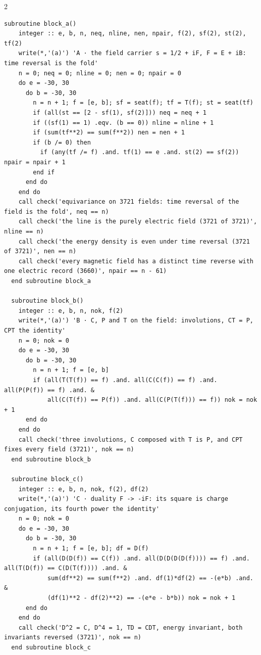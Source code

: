 \documentclass[10pt]{article}
\begin{document}
\begin{multicols}{2}
\begin{Verbatim}[fontsize=\fontsize{6.0}{6.9}\selectfont,breaklines,breakanywhere,breaksymbolleft={}]
  subroutine block_a()
    integer :: e, b, n, neq, nline, nen, npair, f(2), sf(2), st(2), tf(2)
    write(*,'(a)') 'A · the field carrier s = 1/2 + iF, F = E + iB: time reversal is the fold'
    n = 0; neq = 0; nline = 0; nen = 0; npair = 0
    do e = -30, 30
      do b = -30, 30
        n = n + 1; f = [e, b]; sf = seat(f); tf = T(f); st = seat(tf)
        if (all(st == [2 - sf(1), sf(2)])) neq = neq + 1
        if ((sf(1) == 1) .eqv. (b == 0)) nline = nline + 1
        if (sum(tf**2) == sum(f**2)) nen = nen + 1
        if (b /= 0) then
          if (any(tf /= f) .and. tf(1) == e .and. st(2) == sf(2)) npair = npair + 1
        end if
      end do
    end do
    call check('equivariance on 3721 fields: time reversal of the field is the fold', neq == n)
    call check('the line is the purely electric field (3721 of 3721)', nline == n)
    call check('the energy density is even under time reversal (3721 of 3721)', nen == n)
    call check('every magnetic field has a distinct time reverse with one electric record (3660)', npair == n - 61)
  end subroutine block_a

  subroutine block_b()
    integer :: e, b, n, nok, f(2)
    write(*,'(a)') 'B · C, P and T on the field: involutions, CT = P, CPT the identity'
    n = 0; nok = 0
    do e = -30, 30
      do b = -30, 30
        n = n + 1; f = [e, b]
        if (all(T(T(f)) == f) .and. all(C(C(f)) == f) .and. all(P(P(f)) == f) .and. &
            all(C(T(f)) == P(f)) .and. all(C(P(T(f))) == f)) nok = nok + 1
      end do
    end do
    call check('three involutions, C composed with T is P, and CPT fixes every field (3721)', nok == n)
  end subroutine block_b

  subroutine block_c()
    integer :: e, b, n, nok, f(2), df(2)
    write(*,'(a)') 'C · duality F -> -iF: its square is charge conjugation, its fourth power the identity'
    n = 0; nok = 0
    do e = -30, 30
      do b = -30, 30
        n = n + 1; f = [e, b]; df = D(f)
        if (all(D(D(f)) == C(f)) .and. all(D(D(D(D(f)))) == f) .and. all(T(D(f)) == C(D(T(f)))) .and. &
            sum(df**2) == sum(f**2) .and. df(1)*df(2) == -(e*b) .and. &
            (df(1)**2 - df(2)**2) == -(e*e - b*b)) nok = nok + 1
      end do
    end do
    call check('D^2 = C, D^4 = 1, TD = CDT, energy invariant, both invariants reversed (3721)', nok == n)
  end subroutine block_c


\end{Verbatim}
\end{multicols}
\end{document}
